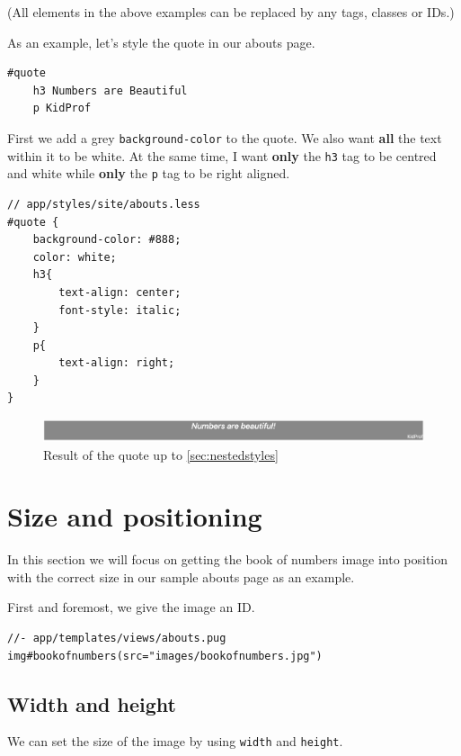 (All elements in the above examples can be  replaced by any tags, classes or IDs.)

As an example, let's style the quote in our abouts page.

\begin{lstlisting}
#quote
    h3 Numbers are Beautiful
    p KidProf
\end{lstlisting}

First we add a grey \texttt{background-color} to the quote. We also want \textbf{all} the text within it to be white. At the same time, I want \textbf{only} the \texttt{h3} tag to be centred and white while \textbf{only} the \texttt{p} tag to be right aligned.

\begin{lstlisting}[language=pug]
// app/styles/site/abouts.less
#quote {
    background-color: #888;
    color: white;
    h3{
        text-align: center;
        font-style: italic;
    }
    p{
        text-align: right;
    }
}
\end{lstlisting}

\begin{figure}[h]
\centering
\includegraphics[width=15cm]{images/chn6-quote1.png}
\caption{Result of the quote up to \cref{sec:nestedstyles}}
\end{figure}


\section{Size and positioning}

In this section we will focus on getting the book of numbers image into position with the correct size in our sample abouts page as an example. 

First and foremost, we give the image an ID. 

\begin{lstlisting}
//- app/templates/views/abouts.pug
img#bookofnumbers(src="images/bookofnumbers.jpg")
\end{lstlisting}

\subsection{Width and height}
\label{sec:width}

We can set the size of the image by using \texttt{width} and \texttt{height}.

